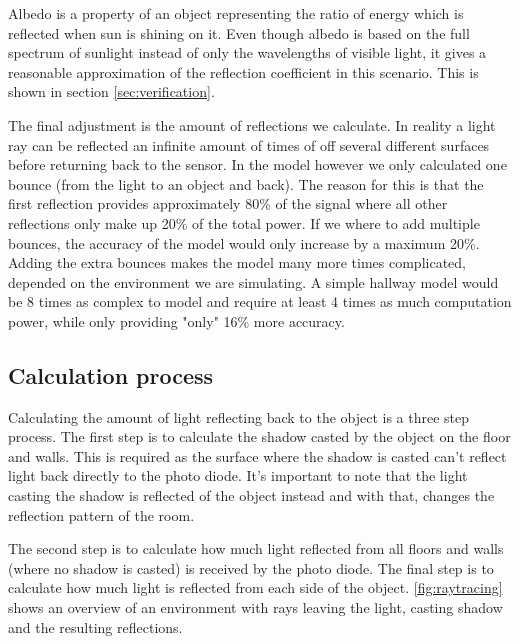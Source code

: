 Albedo is a property of an object representing the ratio of energy which is reflected when sun is shining on it. Even though albedo is based on the full spectrum of sunlight instead of only the wavelengths of visible light, it gives a reasonable approximation of the reflection coefficient in this scenario. This is shown in section \ref{sec:verification}.

The final adjustment is the amount of reflections we calculate. In reality a light ray can be reflected an infinite amount of times of off several different surfaces before returning back to the sensor. In the model however we only calculated one bounce (from the light to an object and back). The reason for this is that the first reflection provides approximately 80\% of the signal where all other reflections only make up 20\% of the total power\cite{indoor_VLC_no_LOS}. If we where to add multiple bounces, the accuracy of the model would only increase by a maximum 20\%. Adding the extra bounces makes the model many more times complicated, depended on the environment we are simulating. A simple hallway model would be 8 times as complex to model and require at least 4 times as much computation power, while only providing "only" 16\% more accuracy.

\subsection{Calculation process}
Calculating the amount of light reflecting back to the object is a three step process. The first step is to calculate the shadow casted by the object on the floor and walls. This is required as the surface where the shadow is casted can't reflect light back directly to the photo diode. It's important to note that the light casting the shadow is reflected of the object instead and with that, changes the reflection pattern of the room.

The second step is to calculate how much light reflected from all floors and walls (where no shadow is casted) is received by the photo diode. The final step is to calculate how much light is reflected from each side of the object. \ref{fig:raytracing} shows an overview of an environment with rays leaving the light, casting shadow and the resulting reflections.

